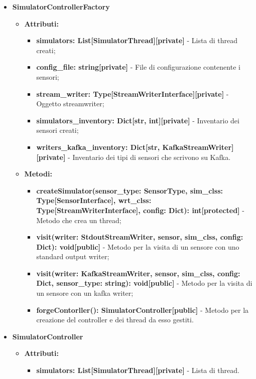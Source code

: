 \documentclass[8pt]{article}
\begin{document}
\begin{itemize}
    \item \textbf{SimulatorControllerFactory}
    \begin{itemize}
        \item \textbf{Attributi:}
        \begin{itemize}
            \item \textbf{simulators: List[SimulatorThread][private]} - Lista di thread creati;
            \item \textbf{config\_file: string[private]} - File di configurazione contenente i sensori;
            \item \textbf{stream\_writer: Type[StreamWriterInterface][private]} - Oggetto streamwriter;
            \item \textbf{simulators\_inventory: Dict[str, int][private]} - Inventario dei sensori creati;
            \item \textbf{writers\_kafka\_inventory: Dict[str, KafkaStreamWriter][private]} - Inventario dei tipi di sensori che scrivono su Kafka.
        \end{itemize}
        \item \textbf{Metodi:}
        \begin{itemize}
            \item \textbf{createSimulator(sensor\_type: SensorType, sim\_clss: Type[SensorInterface], wrt\_clss: Type[StreamWriterInterface], config: Dict): int[protected]} - Metodo che crea un thread;
            \item \textbf{visit(writer: StdoutStreamWriter, sensor, sim\_clss, config: Dict): void[public]} - Metodo per la visita di un sensore con uno standard output writer;
            \item \textbf{visit(writer: KafkaStreamWriter, sensor, sim\_clss, config: Dict, sensor\_type: string): void[public]} - Metodo per la visita di un sensore con un kafka writer;
            \item \textbf{forgeContorller(): SimulatorController[public]} - Metodo per la creazione del controller e dei thread da esso gestiti.
        \end{itemize}
    \end{itemize}
    \item \textbf{SimulatorController}
    \begin{itemize}
        \item \textbf{Attributi:}
        \begin{itemize}
            \item \textbf{simulators: List[SimulatorThread][private]} - Lista di thread.

\end{itemize}
\end{itemize}
\end{itemize}
\end{document}
